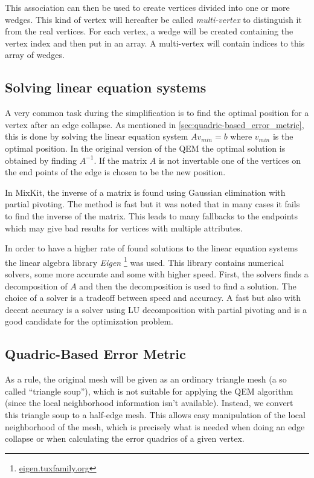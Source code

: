 This association can then be used to create vertices divided into one or more wedges. This kind of vertex will hereafter be called \emph{multi-vertex} to distinguish it from the real vertices. For each vertex, a wedge will be created containing the vertex index and then put in an array. A multi-vertex will contain indices to this array of wedges. 

\subsection{Solving linear equation systems}
A very common task during the simplification is to find the optimal position for a vertex after an edge collapse. As mentioned in \cref{sec:quadric-based_error_metric}, this is done by solving the linear equation system \(A v_{min} = b\) where \(v_{min}\) is the optimal position. In the original version of the QEM the optimal solution is obtained by finding \(A^{-1}\). If the matrix \(A\) is not invertable one of the vertices on the end points of the edge is chosen to be the new position.

In MixKit, the inverse of a matrix is found using Gaussian elimination with partial pivoting. The method is fast but it was noted that in many cases it fails to find the inverse of the matrix. This leads to many fallbacks to the endpoints which may give bad results for vertices with multiple attributes.

In order to have a higher rate of found solutions to the linear equation systems the linear algebra library \emph{Eigen} \footnote{\href{http://eigen.tuxfamily.org}{eigen.tuxfamily.org}} was used. This library contains numerical solvers, some more accurate and some with higher speed. First, the solvers finds a decomposition of $A$ and then the decomposition is used to find a solution. The choice of a solver is a tradeoff between speed and accuracy. A fast but also with decent accuracy is a solver using LU decomposition with partial pivoting and is a good candidate for the optimization problem. 

\subsection{Quadric-Based Error Metric} \label{sec:quadric-based_error_metric2}

As a rule, the original mesh will be given as an ordinary triangle mesh (a so called ``triangle soup''), which is not suitable for applying the QEM algorithm (since the local neighborhood information isn't available). Instead, we convert this triangle soup to a half-edge mesh. This allows easy manipulation of the local neighborhood of the mesh, which is precisely what is needed when doing an edge collapse or when calculating the error quadrics of a given vertex.

